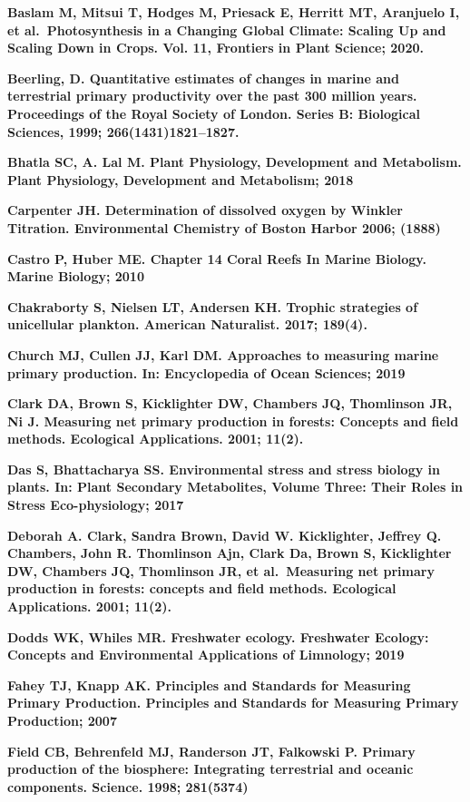 \documentclass[
]{article}
\begin{document}
\textbf{Baslam M, Mitsui T, Hodges M, Priesack E, Herritt MT, Aranjuelo
I, et al.~Photosynthesis in a Changing Global Climate: Scaling Up and
Scaling Down in Crops. Vol. 11, Frontiers in Plant Science; 2020.}

\textbf{Beerling, D. Quantitative estimates of changes in marine and
terrestrial primary productivity over the past 300 million years.
Proceedings of the Royal Society of London. Series B: Biological
Sciences, 1999; 266(1431)1821--1827.}

\textbf{Bhatla SC, A. Lal M. Plant Physiology, Development and
Metabolism. Plant Physiology, Development and Metabolism; 2018}

\textbf{Carpenter JH. Determination of dissolved oxygen by Winkler
Titration. Environmental Chemistry of Boston Harbor 2006; (1888)}

\textbf{Castro P, Huber ME. Chapter 14 Coral Reefs In Marine Biology.
Marine Biology; 2010}

\textbf{Chakraborty S, Nielsen LT, Andersen KH. Trophic strategies of
unicellular plankton. American Naturalist. 2017; 189(4).}

\textbf{Church MJ, Cullen JJ, Karl DM. Approaches to measuring marine
primary production. In: Encyclopedia of Ocean Sciences; 2019}

\textbf{Clark DA, Brown S, Kicklighter DW, Chambers JQ, Thomlinson JR,
Ni J. Measuring net primary production in forests: Concepts and field
methods. Ecological Applications. 2001; 11(2).}

\textbf{Das S, Bhattacharya SS. Environmental stress and stress biology
in plants. In: Plant Secondary Metabolites, Volume Three: Their Roles in
Stress Eco-physiology; 2017}

\textbf{Deborah A. Clark, Sandra Brown, David W. Kicklighter, Jeffrey Q.
Chambers, John R. Thomlinson Ajn, Clark Da, Brown S, Kicklighter DW,
Chambers JQ, Thomlinson JR, et al.~Measuring net primary production in
forests: concepts and field methods. Ecological Applications. 2001;
11(2).}

\textbf{Dodds WK, Whiles MR. Freshwater ecology. Freshwater Ecology:
Concepts and Environmental Applications of Limnology; 2019}

\textbf{Fahey TJ, Knapp AK. Principles and Standards for Measuring
Primary Production. Principles and Standards for Measuring Primary
Production; 2007}

\textbf{Field CB, Behrenfeld MJ, Randerson JT, Falkowski P. Primary
production of the biosphere: Integrating terrestrial and oceanic
components. Science. 1998; 281(5374)}
\end{document}
